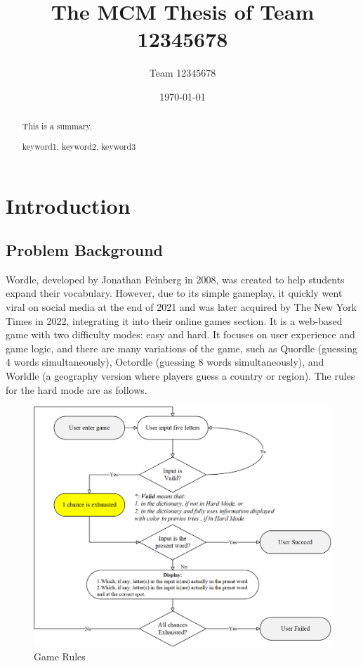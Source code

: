 \documentclass{mcmthesis}  %
\title{The MCM Thesis of Team 12345678}  %
\author{\small Team 12345678}  %
\date{\today}  %
\begin{document}
\begin{abstract}  %
This is a summary.
\begin{keywords}  %
keyword1, keyword2, keyword3
\end{keywords}  %
\end{abstract}  %
\maketitle  %

\tableofcontents  %


\newpage  %
\section{Introduction}  %

\subsection{Problem Background}

Wordle, developed by Jonathan Feinberg in 2008, was created 
to help students expand their vocabulary. However, due to its
simple gameplay, it quickly went viral on social media at the 
end of 2021 and was later acquired by The New York Times in 2022, 
integrating it into their online games section. It is a web-based 
game with two difficulty modes: easy and hard. It focuses on user 
experience and game logic, and there are many variations of the game, 
such as Quordle (guessing 4 words simultaneously), Octordle 
(guessing 8 words simultaneously), and Worldle (a geography version where 
players guess a country or region). The rules for the hard mode are as follows.

\begin{figure}[htbp]  %
\small
\centering  %
\includegraphics[width=14cm]{figure/F1.png}  %
\caption{Game  Rules} \label{Figure1}  %
\end{figure}  %
\end{document}
